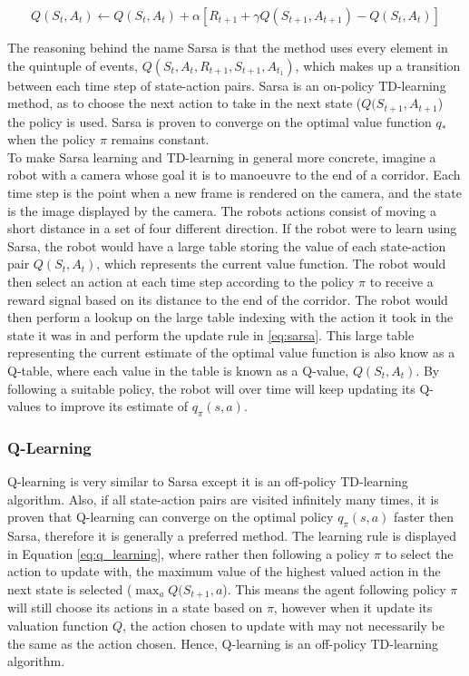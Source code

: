\documentclass[../dissertation.tex]{subfiles}
\begin{document}
\begin{equation}
Q(S_t, A_t) \leftarrow Q(S_t, A_t) + \alpha[R_{t+1} + \gamma Q(S_{t+1}, A_{t+1}) - Q(S_t, A_t)]
\label{eq:sarsa}
\end{equation}

The reasoning behind the name Sarsa is that the method uses every element in the quintuple of events, $Q(S_t, A_t, R_{t+1}, S_{t+1}, A_{t_1})$, which makes up a transition between each time step of state-action pairs. Sarsa is an on-policy TD-learning method, as to choose the next action to take in the next state ($Q(S_{t+1}, A_{t+1}$) the policy is used. Sarsa is proven to converge on the optimal value function $q_*$ when the policy $\pi$ remains constant. \\

To make Sarsa learning and TD-learning in general more concrete, imagine a robot with a camera whose goal it is to manoeuvre to the end of a corridor. Each time step is the point when a new frame is rendered on the camera, and the state is the image displayed by the camera. The robots actions consist of moving a short distance in a set of four different direction. If the robot were to learn using Sarsa, the robot would have a large table storing the value of each state-action pair $Q(S_t, A_t)$, which represents the current value function. The robot would then select an action at each time step according to the policy $\pi$ to receive a reward signal based on its distance to the end of the corridor. The robot would then perform a lookup on the large table indexing with the action it took in the state it was in and perform the update rule in \ref{eq:sarsa}. This large table representing the current estimate of the optimal value function is also know as a Q-table, where each value in the table is known as a Q-value, $Q(S_t, A_t)$. By following a suitable policy, the robot will over time will keep updating its Q-values to improve
its estimate of $q_\pi(s,a)$.

\subsubsection{Q-Learning}

Q-learning is very similar to Sarsa except it is an off-policy TD-learning algorithm. Also, if all state-action pairs are visited infinitely many times, it is proven that Q-learning can converge on the optimal policy $q_\pi(s,a)$ faster then Sarsa, therefore it is generally a preferred method. The learning rule is displayed in Equation \ref{eq:q_learning}, where rather then following a policy $\pi$ to select the action to update with, the maximum value of the highest valued action in the next state is selected ($\max_a Q(S_{t+1}, a$). This means the agent following policy $\pi$ will still choose its actions in a state based on $\pi$, however when it update its valuation function $Q$, the action chosen to update with may not necessarily be the same as the action chosen. Hence, Q-learning is an off-policy TD-learning algorithm.
\end{document}
